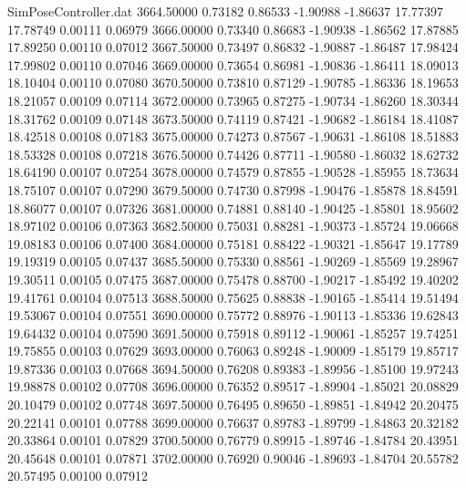 \begin{filecontents}{SimPoseController.dat}
3664.50000    0.73182    0.86533    -1.90988   -1.86637   17.77397   17.78749    0.00111    0.06979
3666.00000    0.73340    0.86683    -1.90938   -1.86562   17.87885   17.89250    0.00110    0.07012
3667.50000    0.73497    0.86832    -1.90887   -1.86487   17.98424   17.99802    0.00110    0.07046
3669.00000    0.73654    0.86981    -1.90836   -1.86411   18.09013   18.10404    0.00110    0.07080
3670.50000    0.73810    0.87129    -1.90785   -1.86336   18.19653   18.21057    0.00109    0.07114
3672.00000    0.73965    0.87275    -1.90734   -1.86260   18.30344   18.31762    0.00109    0.07148
3673.50000    0.74119    0.87421    -1.90682   -1.86184   18.41087   18.42518    0.00108    0.07183
3675.00000    0.74273    0.87567    -1.90631   -1.86108   18.51883   18.53328    0.00108    0.07218
3676.50000    0.74426    0.87711    -1.90580   -1.86032   18.62732   18.64190    0.00107    0.07254
3678.00000    0.74579    0.87855    -1.90528   -1.85955   18.73634   18.75107    0.00107    0.07290
3679.50000    0.74730    0.87998    -1.90476   -1.85878   18.84591   18.86077    0.00107    0.07326
3681.00000    0.74881    0.88140    -1.90425   -1.85801   18.95602   18.97102    0.00106    0.07363
3682.50000    0.75031    0.88281    -1.90373   -1.85724   19.06668   19.08183    0.00106    0.07400
3684.00000    0.75181    0.88422    -1.90321   -1.85647   19.17789   19.19319    0.00105    0.07437
3685.50000    0.75330    0.88561    -1.90269   -1.85569   19.28967   19.30511    0.00105    0.07475
3687.00000    0.75478    0.88700    -1.90217   -1.85492   19.40202   19.41761    0.00104    0.07513
3688.50000    0.75625    0.88838    -1.90165   -1.85414   19.51494   19.53067    0.00104    0.07551
3690.00000    0.75772    0.88976    -1.90113   -1.85336   19.62843   19.64432    0.00104    0.07590
3691.50000    0.75918    0.89112    -1.90061   -1.85257   19.74251   19.75855    0.00103    0.07629
3693.00000    0.76063    0.89248    -1.90009   -1.85179   19.85717   19.87336    0.00103    0.07668
3694.50000    0.76208    0.89383    -1.89956   -1.85100   19.97243   19.98878    0.00102    0.07708
3696.00000    0.76352    0.89517    -1.89904   -1.85021   20.08829   20.10479    0.00102    0.07748
3697.50000    0.76495    0.89650    -1.89851   -1.84942   20.20475   20.22141    0.00101    0.07788
3699.00000    0.76637    0.89783    -1.89799   -1.84863   20.32182   20.33864    0.00101    0.07829
3700.50000    0.76779    0.89915    -1.89746   -1.84784   20.43951   20.45648    0.00101    0.07871
3702.00000    0.76920    0.90046    -1.89693   -1.84704   20.55782   20.57495    0.00100    0.07912

\end{filecontents}

